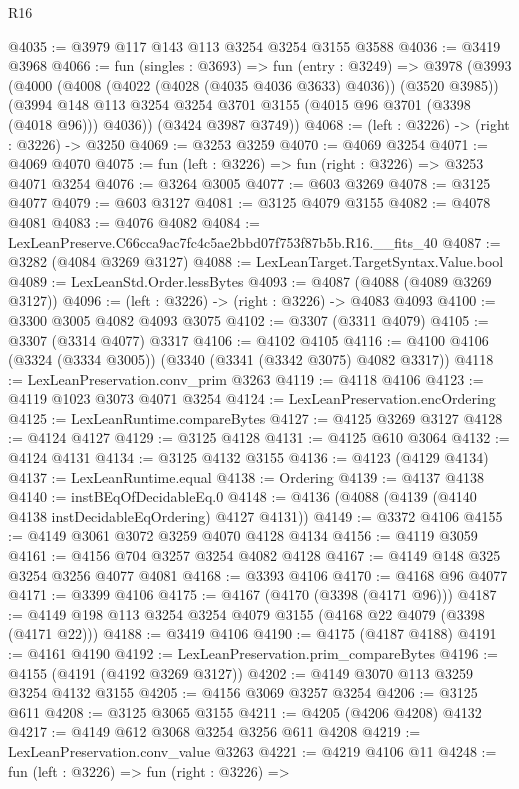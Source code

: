\begin{lexlean}{R16}
\begin{coremodule}
@4035 := @3979 @117 @143 @113 @3254 @3254 @3155 @3588
@4036 := @3419 @3968
@4066 := fun (singles : @3693) =>
  fun (entry : @3249) =>
  @3978
    (@3993
      (@4000
        (@4008 (@4022 (@4028 (@4035 @4036 @3633) @4036)) (@3520 @3985))
        (@3994 @148 @113 @3254 @3254 @3701 @3155 (@4015 @96 @3701 (@3398 (@4018 @96))) @4036))
      (@3424 @3987 @3749))
@4068 := (left : @3226) -> (right : @3226) -> @3250
@4069 := @3253 @3259
@4070 := @4069 @3254
@4071 := @4069 @4070
@4075 := fun (left : @3226) => fun (right : @3226) => @3253 @4071 @3254
@4076 := @3264 @3005
@4077 := @603 @3269
@4078 := @3125 @4077
@4079 := @603 @3127
@4081 := @3125 @4079 @3155
@4082 := @4078 @4081
@4083 := @4076 @4082
@4084 := LexLeanPreserve.C66cca9ac7fc4c5ae2bbd07f753f87b5b.R16.__fits_40
@4087 := @3282 (@4084 @3269 @3127)
@4088 := LexLeanTarget.TargetSyntax.Value.bool
@4089 := LexLeanStd.Order.lessBytes
@4093 := @4087 (@4088 (@4089 @3269 @3127))
@4096 := (left : @3226) -> (right : @3226) -> @4083 @4093
@4100 := @3300 @3005 @4082 @4093 @3075
@4102 := @3307 (@3311 @4079)
@4105 := @3307 (@3314 @4077) @3317
@4106 := @4102 @4105
@4116 := @4100 @4106 (@3324 (@3334 @3005)) (@3340 (@3341 (@3342 @3075) @4082 @3317))
@4118 := LexLeanPreservation.conv_prim @3263
@4119 := @4118 @4106
@4123 := @4119 @1023 @3073 @4071 @3254
@4124 := LexLeanPreservation.encOrdering
@4125 := LexLeanRuntime.compareBytes
@4127 := @4125 @3269 @3127
@4128 := @4124 @4127
@4129 := @3125 @4128
@4131 := @4125 @610 @3064
@4132 := @4124 @4131
@4134 := @3125 @4132 @3155
@4136 := @4123 (@4129 @4134)
@4137 := LexLeanRuntime.equal
@4138 := Ordering
@4139 := @4137 @4138
@4140 := instBEqOfDecidableEq.{0}
@4148 := @4136 (@4088 (@4139 (@4140 @4138 instDecidableEqOrdering) @4127 @4131))
@4149 := @3372 @4106
@4155 := @4149 @3061 @3072 @3259 @4070 @4128 @4134
@4156 := @4119 @3059
@4161 := @4156 @704 @3257 @3254 @4082 @4128
@4167 := @4149 @148 @325 @3254 @3256 @4077 @4081
@4168 := @3393 @4106
@4170 := @4168 @96 @4077
@4171 := @3399 @4106
@4175 := @4167 (@4170 (@3398 (@4171 @96)))
@4187 := @4149 @198 @113 @3254 @3254 @4079 @3155 (@4168 @22 @4079 (@3398 (@4171 @22)))
@4188 := @3419 @4106
@4190 := @4175 (@4187 @4188)
@4191 := @4161 @4190
@4192 := LexLeanPreservation.prim_compareBytes
@4196 := @4155 (@4191 (@4192 @3269 @3127))
@4202 := @4149 @3070 @113 @3259 @3254 @4132 @3155
@4205 := @4156 @3069 @3257 @3254
@4206 := @3125 @611
@4208 := @3125 @3065 @3155
@4211 := @4205 (@4206 @4208) @4132
@4217 := @4149 @612 @3068 @3254 @3256 @611 @4208
@4219 := LexLeanPreservation.conv_value @3263
@4221 := @4219 @4106 @11
@4248 := fun (left : @3226) =>
  fun (right : @3226) =>

\end{coremodule}
\end{lexlean}
